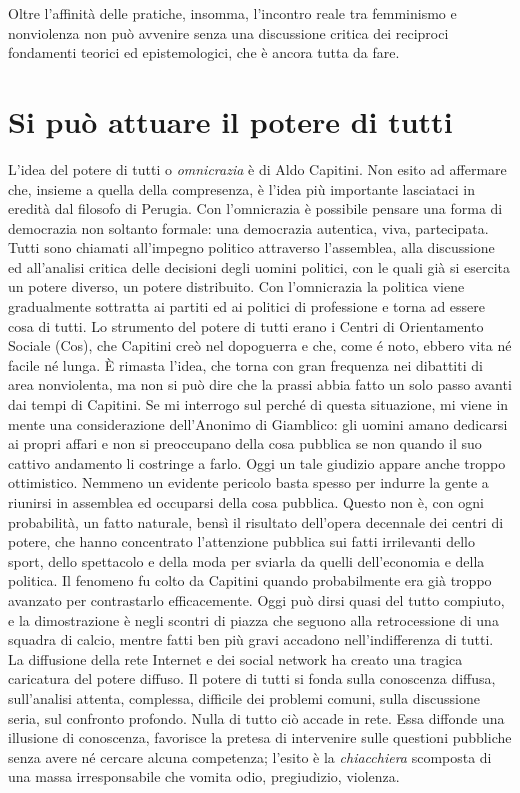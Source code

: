 \documentclass[12pt,oneside,openany]{book}
\begin{document}
Oltre l'affinità delle pratiche, insomma, l'incontro reale tra femminismo e nonviolenza non può avvenire senza una discussione critica dei reciproci fondamenti teorici ed epistemologici, che è ancora tutta da fare.

\setcounter{chapter}{7}\addtocounter{chapter}{-1}

\chapter{Si può attuare il potere di tutti}

L'idea del potere di tutti o \emph{omnicrazia} è di Aldo Capitini. Non esito ad affermare che, insieme a quella della compresenza, è l'idea più importante lasciataci in eredità dal filosofo di Perugia. Con l'omnicrazia è possibile pensare una forma di democrazia non soltanto formale: una democrazia autentica, viva, partecipata. Tutti sono chiamati all'impegno politico attraverso l'assemblea, alla discussione ed all'analisi critica delle decisioni degli uomini politici, con le quali già si esercita un potere diverso, un potere distribuito. Con l'omnicrazia la politica viene gradualmente sottratta ai partiti ed ai politici di professione e torna ad essere cosa di tutti. Lo strumento del potere di tutti erano i Centri di Orientamento Sociale (Cos), che Capitini creò nel dopoguerra e che, come é noto, ebbero vita né facile né lunga. È rimasta l'idea, che torna con gran frequenza nei dibattiti di area nonviolenta, ma non si può dire che la prassi abbia fatto un solo passo avanti dai tempi di Capitini. Se mi interrogo sul perché di questa situazione, mi viene in mente una considerazione dell'Anonimo di Giamblico: gli uomini amano dedicarsi ai propri affari e non si preoccupano della cosa pubblica se non quando il suo cattivo andamento li costringe a farlo. Oggi un tale giudizio appare anche troppo ottimistico. Nemmeno un evidente pericolo basta spesso per indurre la gente a riunirsi in assemblea ed occuparsi della cosa pubblica. Questo non è, con ogni probabilità, un fatto naturale, bensì il risultato dell'opera decennale dei centri di potere, che hanno concentrato l'attenzione pubblica sui fatti irrilevanti dello sport, dello spettacolo e della moda per sviarla da quelli dell'economia e della politica. Il fenomeno fu colto da Capitini quando probabilmente era già troppo avanzato per contrastarlo efficacemente. Oggi può dirsi quasi del tutto compiuto, e la dimostrazione è negli scontri di piazza che seguono alla retrocessione di una squadra di calcio, mentre fatti ben più gravi accadono nell'indifferenza di tutti. La diffusione della rete Internet e dei social network ha creato una tragica caricatura del potere diffuso. Il potere di tutti si fonda sulla conoscenza diffusa, sull'analisi attenta, complessa, difficile dei problemi comuni, sulla discussione seria, sul confronto profondo. Nulla di tutto ciò accade in rete. Essa diffonde una illusione di conoscenza, favorisce la pretesa di intervenire sulle questioni pubbliche senza avere né cercare alcuna competenza; l'esito è la \emph{chiacchiera} scomposta di una massa irresponsabile che vomita odio, pregiudizio, violenza.
\end{document}
